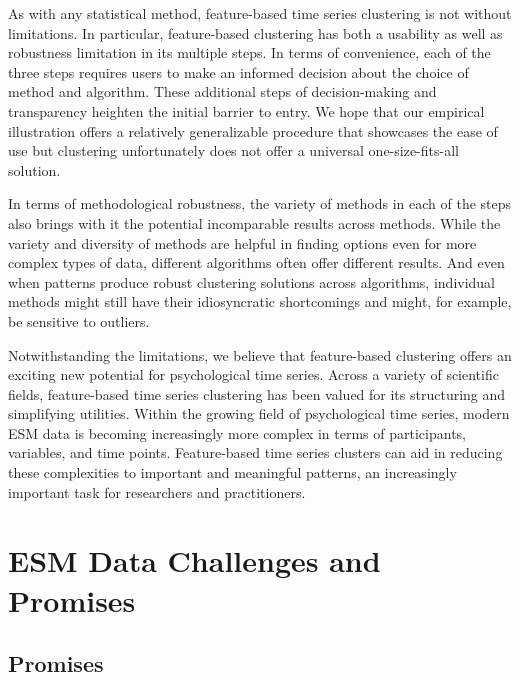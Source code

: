 \documentclass[man, 12pt, a4paper, mask, floatsintext]{apa7}
\theoremstyle{break}
\theoremstyle{plain}
\begin{document}
As with any statistical method, feature-based time series clustering is not without limitations. 
In particular, feature-based clustering has both a usability as well as robustness limitation in its multiple steps. In terms of convenience, each of the three steps requires users to make an informed decision about the choice of method and algorithm. These additional steps of decision-making and transparency heighten the initial barrier to entry. We hope that our empirical illustration offers a relatively generalizable procedure that showcases the ease of use but clustering unfortunately does not offer a universal one-size-fits-all solution. 

In terms of methodological robustness, the variety of methods in each of the steps also brings with it the potential incomparable results across methods. While the variety and diversity of methods are helpful in finding options even for more complex types of data, different algorithms often offer different results. And even when patterns produce robust clustering solutions across algorithms, individual methods might still have their idiosyncratic shortcomings and might, for example, be sensitive to outliers. 

Notwithstanding the limitations, we believe that feature-based clustering offers an exciting new potential for psychological time series. Across a variety of scientific fields, feature-based time series clustering has been valued for its structuring and simplifying utilities. Within the growing field of psychological time series, modern ESM data is becoming increasingly more complex in terms of participants, variables, and time points. Feature-based time series clusters can aid in reducing these complexities to important and meaningful patterns, an increasingly important task for researchers and practitioners. 



%




\printbibliography

\appendix

\section{ESM Data Challenges and Promises}
\label{app:ChallengesAppendix}

\subsection{Promises}
\end{document}
